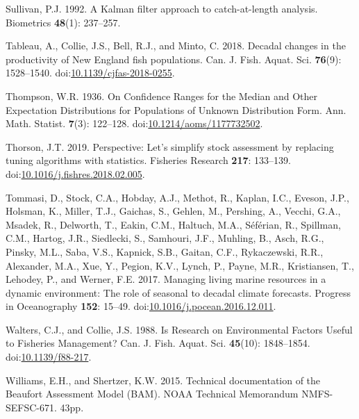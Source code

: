 \documentclass[]{article}
\begin{document}
\leavevmode\hypertarget{ref-sullivan1992Kalman}{}%
Sullivan, P.J. 1992. A Kalman filter approach to catch-at-length
analysis. Biometrics \textbf{48}(1): 237--257.

\leavevmode\hypertarget{ref-tableau2018Decadal}{}%
Tableau, A., Collie, J.S., Bell, R.J., and Minto, C. 2018. Decadal
changes in the productivity of New England fish populations. Can. J.
Fish. Aquat. Sci. \textbf{76}(9): 1528--1540.
doi:\href{https://doi.org/10.1139/cjfas-2018-0255}{10.1139/cjfas-2018-0255}.

\leavevmode\hypertarget{ref-thompson1936Confidence}{}%
Thompson, W.R. 1936. On Confidence Ranges for the Median and Other
Expectation Distributions for Populations of Unknown Distribution Form.
Ann. Math. Statist. \textbf{7}(3): 122--128.
doi:\href{https://doi.org/10.1214/aoms/1177732502}{10.1214/aoms/1177732502}.

\leavevmode\hypertarget{ref-thorson2019Perspective}{}%
Thorson, J.T. 2019. Perspective: Let's simplify stock assessment by
replacing tuning algorithms with statistics. Fisheries Research
\textbf{217}: 133--139.
doi:\href{https://doi.org/10.1016/j.fishres.2018.02.005}{10.1016/j.fishres.2018.02.005}.

\leavevmode\hypertarget{ref-tommasi2017Managing}{}%
Tommasi, D., Stock, C.A., Hobday, A.J., Methot, R., Kaplan, I.C.,
Eveson, J.P., Holsman, K., Miller, T.J., Gaichas, S., Gehlen, M.,
Pershing, A., Vecchi, G.A., Msadek, R., Delworth, T., Eakin, C.M.,
Haltuch, M.A., Séférian, R., Spillman, C.M., Hartog, J.R., Siedlecki,
S., Samhouri, J.F., Muhling, B., Asch, R.G., Pinsky, M.L., Saba, V.S.,
Kapnick, S.B., Gaitan, C.F., Rykaczewski, R.R., Alexander, M.A., Xue,
Y., Pegion, K.V., Lynch, P., Payne, M.R., Kristiansen, T., Lehodey, P.,
and Werner, F.E. 2017. Managing living marine resources in a dynamic
environment: The role of seasonal to decadal climate forecasts. Progress
in Oceanography \textbf{152}: 15--49.
doi:\href{https://doi.org/10.1016/j.pocean.2016.12.011}{10.1016/j.pocean.2016.12.011}.

\leavevmode\hypertarget{ref-walters1988Research}{}%
Walters, C.J., and Collie, J.S. 1988. Is Research on Environmental
Factors Useful to Fisheries Management? Can. J. Fish. Aquat. Sci.
\textbf{45}(10): 1848--1854.
doi:\href{https://doi.org/10.1139/f88-217}{10.1139/f88-217}.

\leavevmode\hypertarget{ref-williams2015BAM}{}%
Williams, E.H., and Shertzer, K.W. 2015. Technical documentation of the
Beaufort Assessment Model (BAM). NOAA Technical Memorandum
NMFS-SEFSC-671. 43pp.
\end{document}

